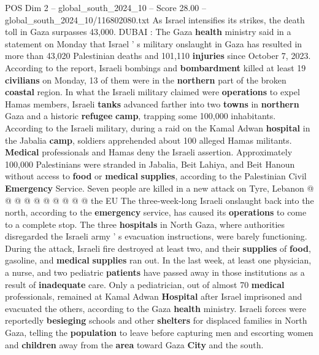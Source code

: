 \begin{textsample}{POS Dim 2 – global\_south\_2024\_10 – Score 28.00 – global\_south\_2024\_10/116802080.txt}  \label{ex:f2_pos_136}
As Israel intensifies its strikes, the death toll in Gaza surpasses 43,000.
DUBAI : The Gaza \textbf{health} ministry said in a statement on Monday that Israel ' s military onslaught in Gaza has resulted in more than 43,020 Palestinian deaths and 101,110 \textbf{injuries} since October 7, 2023.
According to the report, Israeli bombings and \textbf{bombardment} killed at least 19 \textbf{civilians} on Monday, 13 of them were in the \textbf{northern} part of the broken \textbf{coastal} region.
In what the Israeli military claimed were \textbf{operations} to expel Hamas members, Israeli \textbf{tanks} advanced farther into two \textbf{towns} in \textbf{northern} Gaza and a historic \textbf{refugee} \textbf{camp}, trapping some 100,000 inhabitants.
According to the Israeli military, during a raid on the Kamal Adwan \textbf{hospital} in the Jabalia \textbf{camp}, soldiers apprehended about 100 alleged Hamas militants. \textbf{Medical} professionals and Hamas deny the Israeli assertion.
Approximately 100,000 Palestinians were stranded in Jabalia, Beit Lahiya, and Beit Hanoun without access to \textbf{food} or \textbf{medical} \textbf{supplies}, according to the Palestinian Civil \textbf{Emergency} Service.
Seven people are killed in a new attack on Tyre, Lebanon @ @ @ @ @ @ @ @ @ @ the EU The three-week-long Israeli onslaught back into the north, according to the \textbf{emergency} service, has caused its \textbf{operations} to come to a complete stop.
The three \textbf{hospitals} in North Gaza, where authorities disregarded the Israeli army ' s evacuation instructions, were barely functioning.
During the attack, Israeli fire destroyed at least two, and their \textbf{supplies} of \textbf{food}, gasoline, and \textbf{medical} \textbf{supplies} ran out.
In the last week, at least one physician, a nurse, and two pediatric \textbf{patients} have passed away in those institutions as a result of \textbf{inadequate} care.
Only a pediatrician, out of almost 70 \textbf{medical} professionals, remained at Kamal Adwan \textbf{Hospital} after Israel imprisoned and evacuated the others, according to the Gaza \textbf{health} ministry.
Israeli forces were reportedly \textbf{besieging} schools and other \textbf{shelters} for displaced families in North Gaza, telling the \textbf{population} to leave before capturing men and escorting women and \textbf{children} away from the \textbf{area} toward Gaza \textbf{City} and the south.

\end{textsample}
